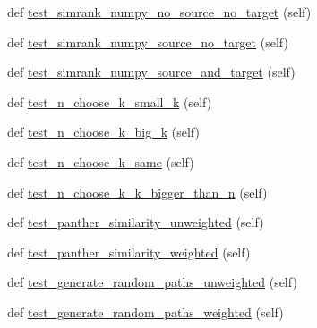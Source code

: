 \begin{DoxyCompactItemize}
\item 
def \hyperlink{classnetworkx_1_1algorithms_1_1tests_1_1test__similarity_1_1TestSimilarity_a131dfedadcf6396ccc8d136bb1fbeafb}{test\+\_\+simrank\+\_\+numpy\+\_\+no\+\_\+source\+\_\+no\+\_\+target} (self)
\item 
def \hyperlink{classnetworkx_1_1algorithms_1_1tests_1_1test__similarity_1_1TestSimilarity_a88f86de282fc1b12d183a750a5da8f93}{test\+\_\+simrank\+\_\+numpy\+\_\+source\+\_\+no\+\_\+target} (self)
\item 
def \hyperlink{classnetworkx_1_1algorithms_1_1tests_1_1test__similarity_1_1TestSimilarity_a2ab9b94ed5854cae8f575e0aeb4f5de9}{test\+\_\+simrank\+\_\+numpy\+\_\+source\+\_\+and\+\_\+target} (self)
\item 
def \hyperlink{classnetworkx_1_1algorithms_1_1tests_1_1test__similarity_1_1TestSimilarity_acb03c60769144959016aa7fb060bb69d}{test\+\_\+n\+\_\+choose\+\_\+k\+\_\+small\+\_\+k} (self)
\item 
def \hyperlink{classnetworkx_1_1algorithms_1_1tests_1_1test__similarity_1_1TestSimilarity_af15d0c223ba4a828e3489cd52505975f}{test\+\_\+n\+\_\+choose\+\_\+k\+\_\+big\+\_\+k} (self)
\item 
def \hyperlink{classnetworkx_1_1algorithms_1_1tests_1_1test__similarity_1_1TestSimilarity_a6d117cb1b94467806cca8648fa6e5811}{test\+\_\+n\+\_\+choose\+\_\+k\+\_\+same} (self)
\item 
def \hyperlink{classnetworkx_1_1algorithms_1_1tests_1_1test__similarity_1_1TestSimilarity_af7ef74ad970a689b2b11bb9c04d731fe}{test\+\_\+n\+\_\+choose\+\_\+k\+\_\+k\+\_\+bigger\+\_\+than\+\_\+n} (self)
\item 
def \hyperlink{classnetworkx_1_1algorithms_1_1tests_1_1test__similarity_1_1TestSimilarity_a3ece7f3657bc019b6c7ce85e490d8b4c}{test\+\_\+panther\+\_\+similarity\+\_\+unweighted} (self)
\item 
def \hyperlink{classnetworkx_1_1algorithms_1_1tests_1_1test__similarity_1_1TestSimilarity_a6c57901db2933b12a8b3b7f229cfaecb}{test\+\_\+panther\+\_\+similarity\+\_\+weighted} (self)
\item 
def \hyperlink{classnetworkx_1_1algorithms_1_1tests_1_1test__similarity_1_1TestSimilarity_afe5404d1bf5d0f2ab52ac03e761d6800}{test\+\_\+generate\+\_\+random\+\_\+paths\+\_\+unweighted} (self)
\item 
def \hyperlink{classnetworkx_1_1algorithms_1_1tests_1_1test__similarity_1_1TestSimilarity_a90d56e65e6a519c69ea145d5666e8064}{test\+\_\+generate\+\_\+random\+\_\+paths\+\_\+weighted} (self)
\end{DoxyCompactItemize}
